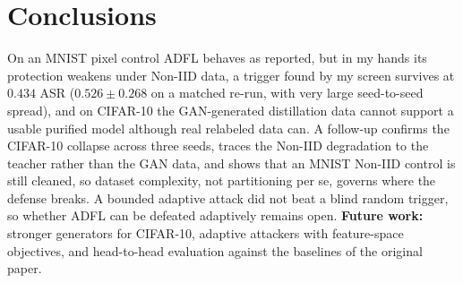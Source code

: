 \documentclass[conference]{IEEEtran}
\begin{document}
\section{Conclusions}
On an MNIST pixel control ADFL behaves as reported, but in my hands its protection weakens under Non-IID data, a trigger found by my screen survives at $0.434$ ASR ($0.526\pm0.268$ on a matched re-run, with very large seed-to-seed spread), and on CIFAR-10 the GAN-generated distillation data cannot support a usable purified model although real relabeled data can. A follow-up confirms the CIFAR-10 collapse across three seeds, traces the Non-IID degradation to the teacher rather than the GAN data, and shows that an MNIST Non-IID control is still cleaned, so dataset complexity, not partitioning per se, governs where the defense breaks. A bounded adaptive attack did not beat a blind random trigger, so whether ADFL can be defeated adaptively remains open. \textbf{Future work:} stronger generators for CIFAR-10, adaptive attackers with feature-space objectives, and head-to-head evaluation against the baselines of the original paper.



\end{document}
